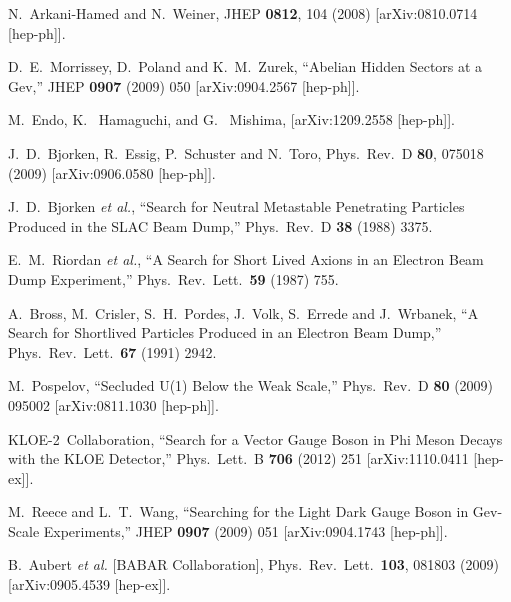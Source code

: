   N.~Arkani-Hamed and N.~Weiner,
  JHEP {\bf 0812}, 104 (2008)
  [arXiv:0810.0714 [hep-ph]].

D.~E.~Morrissey, D.~Poland and K.~M.~Zurek,
``Abelian Hidden Sectors at a Gev,''
JHEP {\bf 0907} (2009) 050
[arXiv:0904.2567 [hep-ph]].

M.~Endo, K.~ Hamaguchi, and G.~ Mishima, [arXiv:1209.2558 [hep-ph]]. 

  J.~D.~Bjorken, R.~Essig, P.~Schuster and N.~Toro,
  Phys.\ Rev.\ D {\bf 80}, 075018 (2009)
  [arXiv:0906.0580 [hep-ph]].

J.~D.~Bjorken {\it et al.},
``Search for Neutral Metastable Penetrating Particles Produced in the SLAC Beam Dump,''
Phys.\ Rev.\ D {\bf 38} (1988) 3375.

E.~M.~Riordan {\it et al.},
``A Search for Short Lived Axions in an Electron Beam Dump Experiment,''
Phys.\ Rev.\ Lett.\ {\bf 59} (1987) 755.

A.~Bross, M.~Crisler, S.~H.~Pordes, J.~Volk, S.~Errede and J.~Wrbanek,
``A Search for Shortlived Particles Produced in an Electron Beam Dump,''
Phys.\ Rev.\ Lett.\ {\bf 67} (1991) 2942.


M.~Pospelov,
``Secluded U(1) Below the Weak Scale,''
Phys.\ Rev.\ D {\bf 80} (2009) 095002
[arXiv:0811.1030 [hep-ph]].

KLOE-2~Collaboration,
``Search for a Vector Gauge Boson in Phi Meson Decays with the KLOE Detector,''
Phys.\ Lett.\ B {\bf 706} (2012) 251
[arXiv:1110.0411 [hep-ex]].

M.~Reece and L.~T.~Wang,
``Searching for the Light Dark Gauge Boson in Gev-Scale Experiments,''
JHEP {\bf 0907} (2009) 051
[arXiv:0904.1743 [hep-ph]].

  B.~Aubert {\it et al.}  [BABAR Collaboration], Phys.\ Rev.\ Lett.\  {\bf 103}, 081803 (2009) [arXiv:0905.4539 [hep-ex]].

